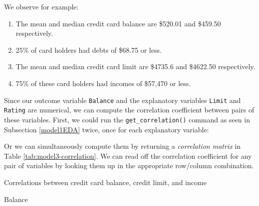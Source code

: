 \documentclass[12pt,]{krantz}
\makeatletter
\newenvironment{Shaded}{\begin{snugshade}}{\end{snugshade}}
\newcommand{\KeywordTok}[1]{\textcolor[rgb]{0.27,0.27,0.27}{\textbf{#1}}}
\newcommand{\StringTok}[1]{\textcolor[rgb]{0.5,0.5,0.5}{#1}}
\newcommand{\OperatorTok}[1]{\textcolor[rgb]{0.43,0.43,0.43}{\textbf{#1}}}
\newcommand{\NormalTok}[1]{#1}
\providecommand{\tightlist}{%
  \setlength{\itemsep}{0pt}\setlength{\parskip}{0pt}}
\newenvironment{kframe}{%
\medskip{}
\setlength{\fboxsep}{.8em}
 \def\at@end@of@kframe{}%
 \ifinner\ifhmode%
  \def\at@end@of@kframe{\end{minipage}}%
  \begin{minipage}{\columnwidth}%
 \fi\fi%
 \def\FrameCommand##1{\hskip\@totalleftmargin \hskip-\fboxsep
 \colorbox{shadecolor}{##1}\hskip-\fboxsep
     \hskip-\linewidth \hskip-\@totalleftmargin \hskip\columnwidth}%
 \MakeFramed {\advance\hsize-\width
   \@totalleftmargin\z@ \linewidth\hsize
   \@setminipage}}%
 {\par\unskip\endMakeFramed%
 \at@end@of@kframe}
\renewenvironment{Shaded}{\begin{kframe}}{\end{kframe}}
\makeatother
\begin{document}
We observe for example:

\begin{enumerate}
\def\labelenumi{\arabic{enumi}.}
\tightlist
\item
  The mean and median credit card balance are \$520.01 and \$459.50
  respectively.
\item
  25\% of card holders had debts of \$68.75 or less.
\item
  The mean and median credit card limit are \$4735.6 and \$4622.50
  respectively.
\item
  75\% of these card holders had incomes of \$57,470 or less.
\end{enumerate}

Since our outcome variable \texttt{Balance} and the explanatory
variables \texttt{Limit} and \texttt{Rating} are numerical, we can
compute the correlation coefficient between pairs of these variables.
First, we could run the \texttt{get\_correlation()} command as seen in
Subsection \ref{model1EDA} twice, once for each explanatory variable:

\begin{Shaded}
\end{Shaded}

Or we can simultaneously compute them by returning a \emph{correlation
matrix} in Table \ref{tab:model3-correlation}. We can read off the
correlation coefficient for any pair of variables by looking them up in
the appropriate row/column combination.

\begin{Shaded}
\end{Shaded}

\label{tab:model3-correlation}Correlations between credit card balance,
credit limit, and income

Balance
\end{document}

